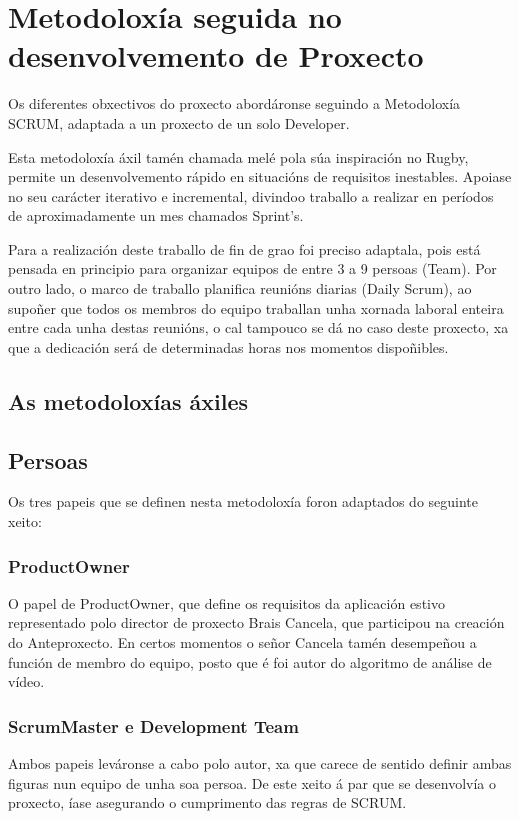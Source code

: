 \chapter{Metodoloxía seguida no desenvolvemento de Proxecto}

Os diferentes obxectivos do proxecto abordáronse seguindo a Metodoloxía SCRUM, adaptada a
un proxecto de un solo Developer.

Esta metodoloxía áxil tamén chamada melé pola súa inspiración no Rugby, permite un
desenvolvemento rápido en situacións de requisitos inestables. Apoiase no seu carácter 
iterativo e incremental, divindoo traballo a realizar en períodos de aproximadamente un mes
chamados Sprint's.

Para a realización deste traballo de fin de grao foi preciso adaptala, pois está pensada en 
principio para organizar equipos de entre 3 a 9 persoas (Team). Por outro lado, o marco de 
traballo planifica reunións diarias (Daily Scrum), ao supoñer que todos os membros do equipo 
traballan unha xornada laboral enteira entre cada unha destas reunións, o cal tampouco se dá 
no caso deste proxecto, xa que a dedicación será de determinadas horas nos momentos dispoñibles.

\section{As metodoloxías áxiles}

\section{Persoas}

    Os tres papeis que se definen nesta metodoloxía \cite{la-guia-de-scrum} foron 
    adaptados do seguinte xeito:

    \subsection{ProductOwner}
        O papel de ProductOwner, que define os requisitos da aplicación estivo representado 
        polo director de proxecto Brais Cancela, que participou na creación do Anteproxecto.
        En certos momentos o señor Cancela tamén desempeñou a función de membro do equipo, 
        posto que é foi autor do algoritmo de análise de vídeo. 

    \subsection{ScrumMaster e Development Team}
        Ambos papeis leváronse a cabo polo autor, xa que carece de sentido definir ambas figuras
        nun equipo de unha soa persoa. De este xeito á par que se desenvolvía o proxecto, íase
        asegurando o cumprimento das regras de SCRUM.
    
